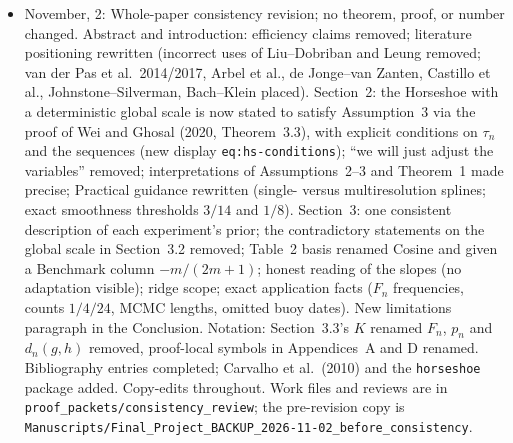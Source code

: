 \documentclass[11pt]{article}
\begin{document}
\begin{itemize}
    \item November, 2: Whole-paper consistency revision; no theorem, proof, or number changed. Abstract and introduction: efficiency claims removed; literature positioning rewritten (incorrect uses of Liu--Dobriban and Leung removed; van der Pas et al.\ 2014/2017, Arbel et al., de Jonge--van Zanten, Castillo et al., Johnstone--Silverman, Bach--Klein placed). Section~2: the Horseshoe with a deterministic global scale is now stated to satisfy Assumption~3 via the proof of Wei and Ghosal (2020, Theorem~3.3), with explicit conditions on $\tau_n$ and the sequences (new display \texttt{eq:hs-conditions}); ``we will just adjust the variables'' removed; interpretations of Assumptions~2--3 and Theorem~1 made precise; Practical guidance rewritten (single- versus multiresolution splines; exact smoothness thresholds $3/14$ and $1/8$). Section~3: one consistent description of each experiment's prior; the contradictory statements on the global scale in Section~3.2 removed; Table~2 basis renamed Cosine and given a Benchmark column $-m/(2m+1)$; honest reading of the slopes (no adaptation visible); ridge scope; exact application facts ($F_n$ frequencies, counts $1/4/24$, MCMC lengths, omitted buoy dates). New limitations paragraph in the Conclusion. Notation: Section~3.3's $K$ renamed $F_n$, $p_n$ and $d_n(g,h)$ removed, proof-local symbols in Appendices~A and D renamed. Bibliography entries completed; Carvalho et al.\ (2010) and the \texttt{horseshoe} package added. Copy-edits throughout. Work files and reviews are in \texttt{proof\_packets/consistency\_review}; the pre-revision copy is \texttt{Manuscripts/Final\_Project\_BACKUP\_2026-11-02\_before\_consistency}.


\end{itemize}
\end{document}
